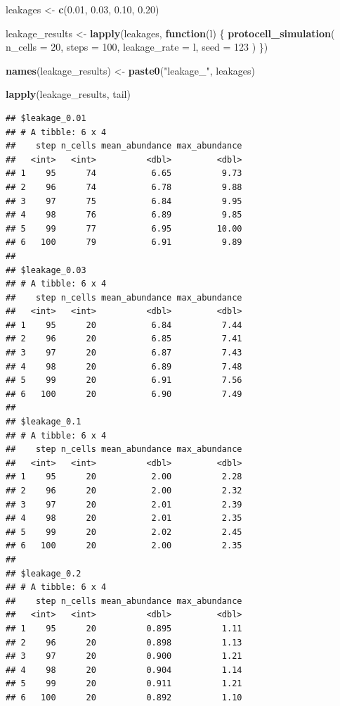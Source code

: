 \documentclass[
  oneside,
  openany]{book}
\newenvironment{Shaded}{\begin{snugshade}}{\end{snugshade}}
\newcommand{\AttributeTok}[1]{\textcolor[rgb]{0.13,0.29,0.53}{#1}}
\newcommand{\ControlFlowTok}[1]{\textcolor[rgb]{0.13,0.29,0.53}{\textbf{#1}}}
\newcommand{\DecValTok}[1]{\textcolor[rgb]{0.00,0.00,0.81}{#1}}
\newcommand{\FloatTok}[1]{\textcolor[rgb]{0.00,0.00,0.81}{#1}}
\newcommand{\FunctionTok}[1]{\textcolor[rgb]{0.13,0.29,0.53}{\textbf{#1}}}
\newcommand{\NormalTok}[1]{#1}
\newcommand{\OtherTok}[1]{\textcolor[rgb]{0.56,0.35,0.01}{#1}}
\newcommand{\StringTok}[1]{\textcolor[rgb]{0.31,0.60,0.02}{#1}}
\begin{document}
\begin{Shaded}
\begin{Highlighting}[]
\NormalTok{leakages }\OtherTok{\textless{}{-}} \FunctionTok{c}\NormalTok{(}\FloatTok{0.01}\NormalTok{, }\FloatTok{0.03}\NormalTok{, }\FloatTok{0.10}\NormalTok{, }\FloatTok{0.20}\NormalTok{)}

\NormalTok{leakage\_results }\OtherTok{\textless{}{-}} \FunctionTok{lapply}\NormalTok{(leakages, }\ControlFlowTok{function}\NormalTok{(l) \{}
  \FunctionTok{protocell\_simulation}\NormalTok{(}
    \AttributeTok{n\_cells =} \DecValTok{20}\NormalTok{,}
    \AttributeTok{steps =} \DecValTok{100}\NormalTok{,}
    \AttributeTok{leakage\_rate =}\NormalTok{ l,}
    \AttributeTok{seed =} \DecValTok{123}
\NormalTok{  )}
\NormalTok{\})}

\FunctionTok{names}\NormalTok{(leakage\_results) }\OtherTok{\textless{}{-}} \FunctionTok{paste0}\NormalTok{(}\StringTok{"leakage\_"}\NormalTok{, leakages)}

\FunctionTok{lapply}\NormalTok{(leakage\_results, tail)}
\end{Highlighting}
\end{Shaded}

\begin{verbatim}
## $leakage_0.01
## # A tibble: 6 x 4
##    step n_cells mean_abundance max_abundance
##   <int>   <int>          <dbl>         <dbl>
## 1    95      74           6.65          9.73
## 2    96      74           6.78          9.88
## 3    97      75           6.84          9.95
## 4    98      76           6.89          9.85
## 5    99      77           6.95         10.00
## 6   100      79           6.91          9.89
## 
## $leakage_0.03
## # A tibble: 6 x 4
##    step n_cells mean_abundance max_abundance
##   <int>   <int>          <dbl>         <dbl>
## 1    95      20           6.84          7.44
## 2    96      20           6.85          7.41
## 3    97      20           6.87          7.43
## 4    98      20           6.89          7.48
## 5    99      20           6.91          7.56
## 6   100      20           6.90          7.49
## 
## $leakage_0.1
## # A tibble: 6 x 4
##    step n_cells mean_abundance max_abundance
##   <int>   <int>          <dbl>         <dbl>
## 1    95      20           2.00          2.28
## 2    96      20           2.00          2.32
## 3    97      20           2.01          2.39
## 4    98      20           2.01          2.35
## 5    99      20           2.02          2.45
## 6   100      20           2.00          2.35
## 
## $leakage_0.2
## # A tibble: 6 x 4
##    step n_cells mean_abundance max_abundance
##   <int>   <int>          <dbl>         <dbl>
## 1    95      20          0.895          1.11
## 2    96      20          0.898          1.13
## 3    97      20          0.900          1.21
## 4    98      20          0.904          1.14
## 5    99      20          0.911          1.21
## 6   100      20          0.892          1.10
\end{verbatim}
\end{document}
